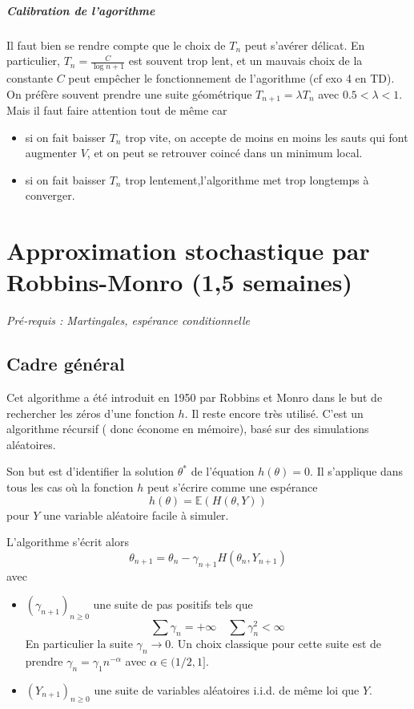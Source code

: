 \documentclass[a4paper,12pt]{book}
\newcommand{\E}{\mathbb{E}}
\begin{document}
\paragraph{Calibration de l'agorithme }
Il faut bien se rendre compte que le choix de $T_n$ peut s'avérer délicat. En particulier, $T_n=\frac{C}{\log n+1}$ est souvent trop lent, et un mauvais choix de la constante $C$ peut empêcher le fonctionnement de l'agorithme (cf exo 4 en TD).\\
On préfère souvent prendre une suite géométrique $T_{n+1}=\lambda T_n$ avec $0.5<\lambda<1$. Mais il faut faire attention tout de même car
\begin{itemize}
\item si on fait baisser $T_n$ trop vite, on accepte de moins en moins les sauts qui font augmenter $V$, et on peut se retrouver coincé dans un minimum local.
\item si on fait baisser $T_n$ trop lentement,l'algorithme met trop longtemps à converger.
\end{itemize}


\chapter[Robbins-Monro]{Approximation stochastique par Robbins-Monro (1,5 semaines)}

\textit{Pré-requis : Martingales, espérance conditionnelle}
\section{Cadre général}
Cet algorithme a été introduit en 1950 par Robbins et Monro dans le but de rechercher les zéros d'une fonction $h$. Il reste encore très utilisé. C'est un algorithme récursif ( donc économe en mémoire), basé sur des simulations aléatoires.

Son but est d'identifier la solution $\theta^*$ de l'équation $h(\theta)=0$. Il s'applique dans tous les cas où la fonction $h$ peut s'écrire comme une espérance
$$h(\theta)=\E(H(\theta, Y))$$ pour $Y$ une variable aléatoire facile à simuler.

L'algorithme s'écrit alors
$$\theta_{n+1}=\theta_n -\gamma_{n+1}H(\theta_n, Y_{n+1})$$
avec \begin{itemize}
\item $(\gamma_{n+1})_{n\ge0}$ une suite de pas positifs tels que
$$\sum \gamma_n =+\infty \quad \sum \gamma_n^2 <\infty$$
En particulier la suite $\gamma_n\to 0$. Un choix classique pour cette suite est de prendre $\gamma_n=\gamma_1 n^{-\alpha}$ avec $\alpha\in (1/2, 1]$.
\item $(Y_{n+1})_{n\ge 0}$ une suite de variables aléatoires i.i.d. de même loi que $Y$.
\end{itemize}
\end{document}
